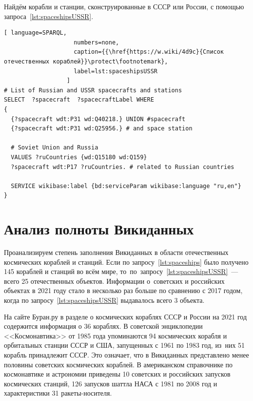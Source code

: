 Найдём корабли и станции, сконструированные в СССР или России, 
с помощью запроса~\ref{lst:spaceshipsUSSR}.

\begin{lstlisting}[ language=SPARQL, 
                    numbers=none, 
                    caption={{\href{https://w.wiki/4d9c}{Список отечественных кораблей}}\protect\footnotemark}, 
                    label=lst:spaceshipsUSSR
                  ]
# List of Russian and USSR spacecrafts and stations
SELECT  ?spacecraft  ?spacecraftLabel WHERE
{
  {?spacecraft wdt:P31 wd:Q40218.} UNION #spacecraft
  {?spacecraft wdt:P31 wd:Q25956.} # and space station
  
  # Soviet Union and Russia
  VALUES ?ruCountries {wd:Q15180 wd:Q159}
  ?spacecraft wdt:P17 ?ruCountries. # related to Russian countries
  
  SERVICE wikibase:label {bd:serviceParam wikibase:language "ru,en"}
}
\end{lstlisting}



\section{Анализ полноты Викиданных}

Проанализируем степень заполнения Викиданных в области отечественных космических кораблей и станций. 
Если по запросу~\ref{lst:spaceships} было получено 145 кораблей и станций во всём мире, 
то~по~запросу~\ref{lst:spaceshipsUSSR}~--- всего 25 отечественных объектов. 
Информации о~советских и российских объектах в 2021 году 
стало в несколько раз больше по сравнению с 2017 годом, 
когда по запросу~\ref{lst:spaceshipsUSSR} выдавалось всего 3 объекта. 

На сайте Буран.ру в разделе о космических кораблях СССР и России на 2021 год 
содержится информация о 36 кораблях\autocite{spacecraftBuran}. 
В советской энциклопедии <<Космонавтика>> от 1985 года упоминаются 
94 космических корабля и орбитальных станции СССР и США, 
запущенных с 1961 по 1983 год, 
из~них 51 корабль принадлежит СССР\autocite[498]{spacecraftCosmonavtika}. 
Это означает, что в Викиданных представлено менее половины советских космических кораблей. 
В американском справочнике по космонавтике и астрономии 
приведены 10 советских и российских запусков космических станций\autocite[296]{spacecraftSAA}, 
126 запусков шаттла НАСА с 1981 по 2008 год\autocite[288]{spacecraftSAA} 
и характеристики 31 ракеты-носителя\autocite[290--291]{spacecraftSAA}. 




